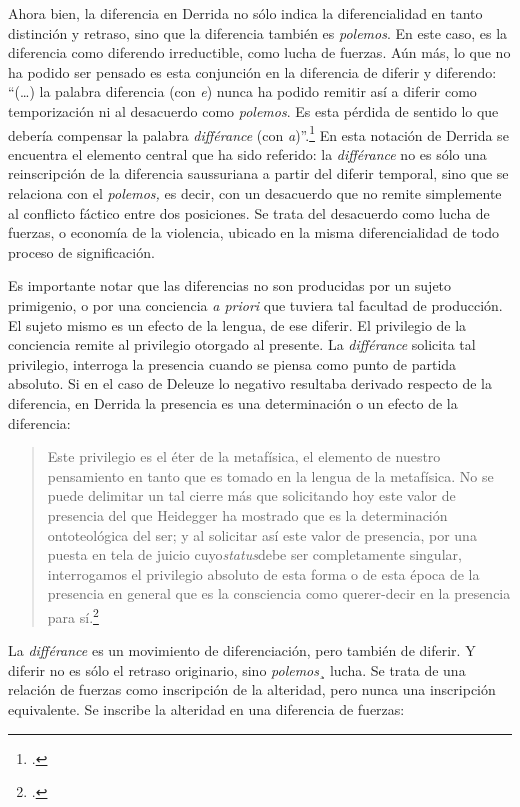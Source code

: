 Ahora bien, la diferencia en Derrida no sólo indica la diferencialidad en tanto distinción y retraso, sino que la diferencia también es \emph{polemos}. En este caso, es la diferencia como diferendo irreductible, como lucha de fuerzas. Aún más, lo que no ha podido ser pensado es esta conjunción en la diferencia de diferir y diferendo: \enquote{(\dots) la palabra diferencia (con \emph{e}) nunca ha podido remitir así a diferir como temporización ni al desacuerdo como \emph{polemos}. Es esta pérdida de sentido lo que debería compensar  la palabra \emph{différance} (con \emph{a})}.\footcite[8]{@6980-DERRIDA1989} En esta notación de Derrida se encuentra el elemento central que ha sido referido: la \emph{différance} no es sólo una reinscripción de la diferencia saussuriana a partir del diferir temporal, sino que se relaciona con el \emph{polemos,} es decir, con un desacuerdo que no remite simplemente al conflicto fáctico entre dos posiciones. Se trata del desacuerdo como lucha de fuerzas, o economía de la violencia, ubicado en la misma diferencialidad de todo proceso de significación.

Es importante notar que las diferencias no son producidas por un sujeto primigenio, o por una conciencia \emph{a priori} que tuviera tal facultad de producción. El sujeto mismo es un efecto de la lengua, de ese diferir. El privilegio de la conciencia remite al privilegio otorgado al presente. La \emph{différance} solicita tal privilegio, interroga la presencia cuando se piensa como punto de partida absoluto. Si en el caso de Deleuze lo negativo resultaba derivado respecto de la diferencia, en Derrida la presencia es una determinación o un efecto de la diferencia:

\begin{quote}
Este privilegio es el éter de la metafísica, el elemento de nuestro pensamiento en tanto que es tomado en la lengua de la metafísica. No se puede delimitar un tal cierre más que solicitando hoy este valor de presencia del que Heidegger ha mostrado que es la determinación ontoteológica del ser; y al solicitar así este valor de presencia, por una puesta en tela de juicio cuyo\emph{status}debe ser completamente singular, interrogamos el privilegio absoluto de esta forma o de esta época de la presencia en general que es la consciencia como querer-decir en la presencia para sí.\footcite[17]{@6980-DERRIDA1989}
\end{quote}

La \emph{différance} es un movimiento de diferenciación, pero también de diferir. Y diferir no es sólo el retraso originario, sino \emph{polemos}¸ lucha. Se trata de una relación de fuerzas como inscripción de la alteridad, pero nunca una inscripción equivalente. Se inscribe la alteridad en una diferencia de fuerzas:

